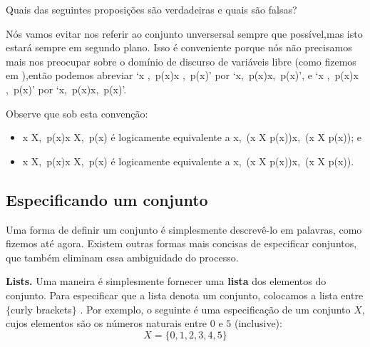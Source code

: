 \begin{exercise}
Quais das seguintes proposições são verdadeiras e quais são falsas?
  \in {} \qquad {} \in {} \qquad {} \in {} \qquad {} \in {} \qquad {} \in {}   \in {} \qquad {} \in {} \qquad {} \in {} \qquad {} \in {} \qquad {} \in {} 
\end{exercise}

Nós vamos evitar nos referir ao conjunto unversersal  sempre que possível,mas isto estará sempre em segundo plano. Isso é conveniente porque nós não precisamos mais nos preocupar sobre o domínio de discurso de variáveis libre (como fizemos em ),então podemos abreviar `\forall x \in {},\, p(x)\forall x \in {},\, p(x)' por `\forall x,\, p(x)\forall x,\, p(x)', e `\exists x \in {},\, p(x)\exists x \in {},\, p(x)' por `\exists x,\, p(x)\exists x,\, p(x)'.

Observe que sob esta convenção:
\begin{itemize}
\item \forall x \in X,\, p(x)\forall x \in X,\, p(x) é logicamente equivalente a \forall x,\, (x \in X \Rightarrow p(x))\forall x,\, (x \in X \Rightarrow p(x)); e
\item \exists x \in X,\, p(x)\exists x \in X,\, p(x) é logicamente equivalente a \exists x,\, (x \in X \wedge p(x))\exists x,\, (x \in X \wedge p(x)).
\end{itemize}

\subsection*{Especificando um conjunto}
Uma forma de definir um conjunto é simplesmente descrevê-lo em palavras, como fizemos até agora. Existem outras formas mais concisas de especificar conjuntos, que também eliminam essa ambiguidade do processo.

\textbf{Lists.}
Uma maneira é simplesmente fornecer uma \textbf{lista} dos elementos do conjunto. Para especificar que a lista denota um conjunto, colocamos a lista entre $\{$curly brackets$\}$ \inlatex{\{,\textbackslash{}\}}\lindexmmc{\{\dots\textbackslash{}\}}{$\{\dots\}$}. Por exemplo, o seguinte é uma especificação de um conjunto $X$, cujos elementos são os números naturais entre $0$ e $5$ (inclusive):
\[ X = \{ 0, 1, 2, 3, 4, 5 \} \]

